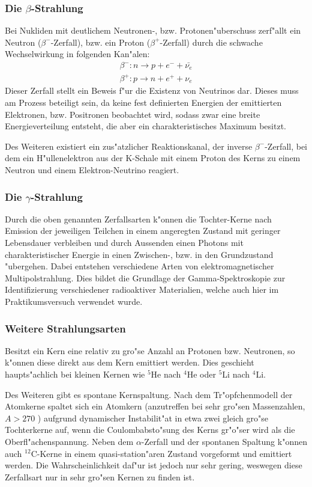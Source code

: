 \documentclass[12pt]{article}
\begin{document}
\subsubsection{Die $\beta$-Strahlung}   
Bei Nukliden mit deutlichem Neutronen-, bzw. Protonen"uberschuss zerf"allt ein Neutron ($\beta^{-}$-Zerfall), bzw. ein Proton ($\beta^{+}$-Zerfall) durch die schwache Wechselwirkung in folgenden Kan"alen:
\begin{align}
\beta^{-}: n\rightarrow p+e^{-}+\bar{\nu_{e}}\\
\beta^{+}: p\rightarrow n+e^{+}+\nu_{e}
\end{align}
Dieser Zerfall stellt ein Beweis f"ur die Existenz von Neutrinos dar. Dieses muss am Prozess beteiligt sein, da keine fest definierten Energien der emittierten Elektronen, bzw. Positronen beobachtet wird, sodass zwar eine breite Energieverteilung entsteht, die aber ein charakteristisches Maximum besitzt.\par 
Des Weiteren existiert ein zus"atzlicher Reaktionskanal, der inverse $\beta^{-}$-Zerfall, bei dem ein H"ullenelektron aus der K-Schale mit einem Proton des Kerns zu einem Neutron und einem Elektron-Neutrino reagiert. 


\subsubsection{Die $\gamma$-Strahlung}
Durch die oben genannten Zerfallsarten k"onnen die Tochter-Kerne nach Emission der jeweiligen Teilchen in einem angeregten Zustand mit geringer Lebensdauer verbleiben und durch Aussenden einen Photons mit charakteristischer Energie in einen Zwischen-, bzw. in den Grundzustand "ubergehen. Dabei entstehen verschiedene Arten von elektromagnetischer Multipolstrahlung. Dies bildet die Grundlage der Gamma-Spektroskopie zur Identifizierung verschiedener radioaktiver Materialien, welche auch hier im Praktikumsversuch verwendet wurde. 

\subsubsection{Weitere Strahlungsarten}
Besitzt ein Kern eine relativ zu gro"se Anzahl an Protonen bzw. Neutronen, so k"onnen diese direkt aus dem Kern emittiert werden. Dies geschieht haupts"achlich bei kleinen Kernen wie $^{5}$He nach $^{4}$He oder $^{5}$Li nach $^{4}$Li. \par 
Des Weiteren gibt es spontane Kernspaltung. Nach dem Tr"opfchenmodell der Atomkerne spaltet sich ein Atomkern (anzutreffen bei sehr gro"sen Massenzahlen, $A>270$ \cite{povh}) aufgrund dynamischer Instabilit"at in etwa zwei gleich gro"se Tochterkerne auf, wenn die Coulombabsto"sung des Kerns gr"o"ser wird als die Oberfl"achenspannung. 
Neben dem $\alpha$-Zerfall und der spontanen Spaltung k"onnen auch $^{12}$C-Kerne in einem quasi-station"aren Zustand vorgeformt und emittiert werden. Die Wahrscheinlichkeit daf"ur ist jedoch nur sehr gering, weswegen diese Zerfallsart nur in sehr gro"sen Kernen zu finden ist.  
\end{document}
